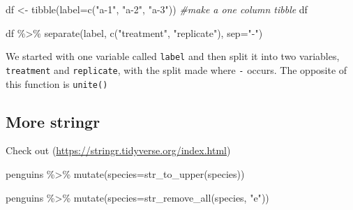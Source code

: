 \documentclass[
]{book}
\newenvironment{Shaded}{\begin{snugshade}}{\end{snugshade}}
\newcommand{\AttributeTok}[1]{\textcolor[rgb]{0.77,0.63,0.00}{#1}}
\newcommand{\CommentTok}[1]{\textcolor[rgb]{0.56,0.35,0.01}{\textit{#1}}}
\newcommand{\FunctionTok}[1]{\textcolor[rgb]{0.00,0.00,0.00}{#1}}
\newcommand{\NormalTok}[1]{#1}
\newcommand{\OtherTok}[1]{\textcolor[rgb]{0.56,0.35,0.01}{#1}}
\newcommand{\SpecialCharTok}[1]{\textcolor[rgb]{0.00,0.00,0.00}{#1}}
\newcommand{\StringTok}[1]{\textcolor[rgb]{0.31,0.60,0.02}{#1}}
\begin{document}
\begin{Shaded}
\begin{Highlighting}[]
\NormalTok{df }\OtherTok{\textless{}{-}} \FunctionTok{tibble}\NormalTok{(}\AttributeTok{label=}\FunctionTok{c}\NormalTok{(}\StringTok{"a{-}1"}\NormalTok{, }\StringTok{"a{-}2"}\NormalTok{, }\StringTok{"a{-}3"}\NormalTok{)) }
\CommentTok{\#make a one column tibble}
\NormalTok{df}
\end{Highlighting}
\end{Shaded}

\begin{Shaded}
\begin{Highlighting}[]
\NormalTok{df }\SpecialCharTok{\%\textgreater{}\%} 
  \FunctionTok{separate}\NormalTok{(label, }\FunctionTok{c}\NormalTok{(}\StringTok{"treatment"}\NormalTok{, }\StringTok{"replicate"}\NormalTok{), }\AttributeTok{sep=}\StringTok{"{-}"}\NormalTok{)}
\end{Highlighting}
\end{Shaded}

We started with one variable called \texttt{label} and then split it into two variables, \texttt{treatment} and \texttt{replicate}, with the split made where \texttt{-} occurs.
The opposite of this function is \texttt{unite()}

\hypertarget{more-stringr}{%
\subsection{More stringr}\label{more-stringr}}

Check out (\url{https://stringr.tidyverse.org/index.html}) \citet{R-stringr}

\begin{Shaded}
\begin{Highlighting}[]
\NormalTok{penguins }\SpecialCharTok{\%\textgreater{}\%} 
  \FunctionTok{mutate}\NormalTok{(}\AttributeTok{species=}\FunctionTok{str\_to\_upper}\NormalTok{(species))}
\end{Highlighting}
\end{Shaded}

\begin{Shaded}
\begin{Highlighting}[]
\NormalTok{penguins }\SpecialCharTok{\%\textgreater{}\%} 
  \FunctionTok{mutate}\NormalTok{(}\AttributeTok{species=}\FunctionTok{str\_remove\_all}\NormalTok{(species, }\StringTok{"e"}\NormalTok{))}
\end{Highlighting}
\end{Shaded}
\end{document}
